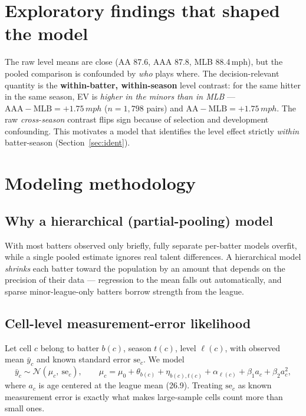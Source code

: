 \documentclass[11pt]{article}
\newcommand{\mph}{\,mph}
\begin{document}
\section{Exploratory findings that shaped the model}
The raw level means are close (AA 87.6, AAA 87.8, MLB 88.4\mph), but the pooled
comparison is confounded by \emph{who} plays where. The decision-relevant quantity
is the \textbf{within-batter, within-season} level contrast: for the same hitter in
the same season, EV is \emph{higher in the minors than in MLB} ---
$\mathrm{AAA}-\mathrm{MLB}=+1.75\mph$ ($n=1{,}798$ pairs) and
$\mathrm{AA}-\mathrm{MLB}=+1.75\mph$. The raw \emph{cross-season} contrast flips
sign because of selection and development confounding. This motivates a model that
identifies the level effect strictly \emph{within} batter-season (Section~\ref{sec:ident}).

\section{Modeling methodology}
\subsection{Why a hierarchical (partial-pooling) model}
With most batters observed only briefly, fully separate per-batter models overfit,
while a single pooled estimate ignores real talent differences. A hierarchical model
\emph{shrinks} each batter toward the population by an amount that depends on the
precision of their data --- regression to the mean falls out automatically, and
sparse minor-league-only batters borrow strength from the league.

\subsection{Cell-level measurement-error likelihood}
Let cell $c$ belong to batter $b(c)$, season $t(c)$, level $\ell(c)$, with observed
mean $\bar y_c$ and known standard error $\mathrm{se}_c$. We model
\begin{equation}
\bar y_c \sim \mathcal{N}\!\left(\mu_c,\ \mathrm{se}_c\right),
\qquad
\mu_c = \mu_0 + \theta_{b(c)} + \eta_{b(c),t(c)} + \alpha_{\ell(c)}
        + \beta_1 a_c + \beta_2 a_c^2,
\end{equation}
where $a_c$ is age centered at the league mean (26.9). Treating $\mathrm{se}_c$ as
known measurement error is exactly what makes large-sample cells count more than
small ones.
\end{document}
